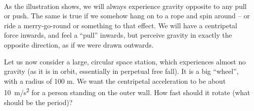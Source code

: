 \begin{figure}[H]
  \centering
\begin{subfigure}[b]{0.4\textwidth}
  \centering
{}
\end{subfigure}
\
\begin{subfigure}[b]{0.4\textwidth}
  \centering
{}
\end{subfigure}
\end{figure}
As the illustration shows, we will always experience gravity opposite to any pull or push. The same is true if we somehow hang on to a rope and spin around -- or ride a merry-go-round or something to that effect. We will have a centripetal force inwards, and feel a ``pull'' inwards, but perceive gravity in exactly the opposite direction, as if we were drawn outwards.

Let us now consider a large, circular space station, which experiences almost no gravity (as it is in orbit, essentially in perpetual free fall). It is a big ``wheel'', with a radius of 100 m. We want the centripetal acceleration to be about \SI{10}{m/s^2} for a person standing on the outer wall. How fast should it rotate (what should be the period)?

